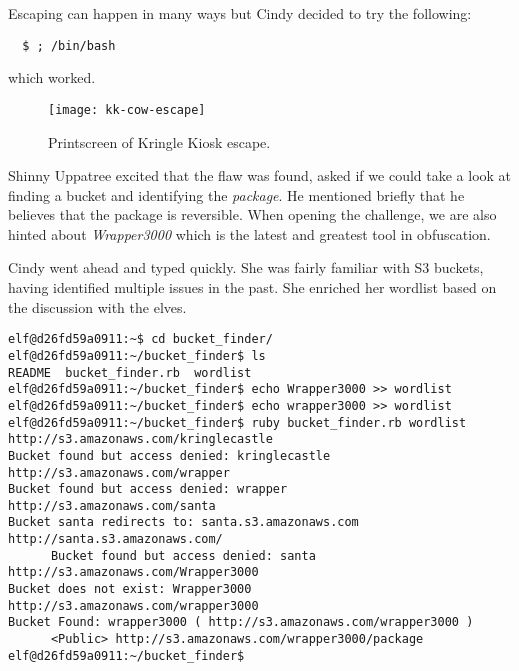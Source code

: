 Escaping can happen in many ways but Cindy decided to try the following:
\begin{verbatim}
  $ ; /bin/bash
\end{verbatim}

which worked.
\newpage
\begin{figure}[h!]
  \texttt{[image: kk-cow-escape]}
  \caption{Printscreen of Kringle Kiosk escape.}
\end{figure}

{\color{codegreen}Shinny Uppatree} excited that the flaw was found, asked if we could take a look at finding a bucket and identifying the \textit{package}.
He mentioned briefly that he believes that the package is reversible. When opening the challenge, we are also hinted about \textit{Wrapper3000} which is the latest and greatest
tool in obfuscation.

Cindy went ahead and typed quickly. She was fairly familiar with S3 buckets, having identified multiple issues in the past. She enriched her wordlist based on the discussion with the elves.
\begin{verbatim}
elf@d26fd59a0911:~$ cd bucket_finder/
elf@d26fd59a0911:~/bucket_finder$ ls
README  bucket_finder.rb  wordlist
elf@d26fd59a0911:~/bucket_finder$ echo Wrapper3000 >> wordlist
elf@d26fd59a0911:~/bucket_finder$ echo wrapper3000 >> wordlist
elf@d26fd59a0911:~/bucket_finder$ ruby bucket_finder.rb wordlist
http://s3.amazonaws.com/kringlecastle
Bucket found but access denied: kringlecastle
http://s3.amazonaws.com/wrapper
Bucket found but access denied: wrapper
http://s3.amazonaws.com/santa
Bucket santa redirects to: santa.s3.amazonaws.com
http://santa.s3.amazonaws.com/
      Bucket found but access denied: santa
http://s3.amazonaws.com/Wrapper3000
Bucket does not exist: Wrapper3000
http://s3.amazonaws.com/wrapper3000
Bucket Found: wrapper3000 ( http://s3.amazonaws.com/wrapper3000 )
      <Public> http://s3.amazonaws.com/wrapper3000/package
elf@d26fd59a0911:~/bucket_finder$
\end{verbatim}


